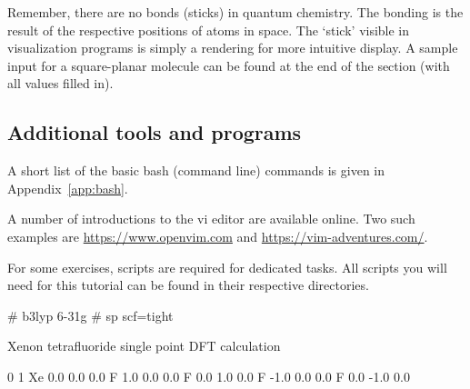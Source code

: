 Remember, there are no bonds (sticks) in quantum chemistry. The bonding is the result of the respective positions of atoms in space. The `stick' visible in visualization programs is simply a rendering for more intuitive display. A sample input for a square-planar molecule can be found at the end of the section (with all values filled in). 


\subsection{Additional tools and programs}

\begin{description}[font=\bfseries]
  \item[Bash shell] A short list of the basic bash (command line) commands is given in Appendix~\ref{app:bash}. 
  \item[vi] A number of introductions to the vi editor are available online. Two such examples are \url{https://www.openvim.com} and \url{https://vim-adventures.com/}.
  \item[Scripts] For some exercises, scripts are required for dedicated tasks. All scripts you will need for this tutorial can be found in their respective directories. 
\end{description}

\begin{gaussinput}[title=A sample \Verb{input.com} file for the \ch{XeF4} molecule.]
# b3lyp 6-31g
# sp scf=tight

Xenon tetrafluoride single point DFT calculation

0 1
Xe  0.0   0.0   0.0
F   1.0   0.0   0.0
F   0.0   1.0   0.0
F  -1.0   0.0   0.0
F   0.0  -1.0   0.0

\end{gaussinput}